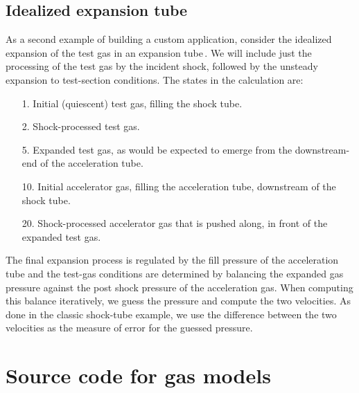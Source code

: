 \documentclass[landscape,12pt,a4paper]{article}
\begin{document}
\subsection{Idealized expansion tube}
%
As a second example of building a custom application, consider the idealized expansion
of the test gas in an expansion tube\,\cite{trimpi_62}.
We will include just the processing of the test gas by the incident shock,
followed by the unsteady expansion to test-section conditions. 
The states in the calculation are:
\begin{itemize}
 \item [1.] Initial (quiescent) test gas, filling the shock tube.
 \item [2.] Shock-processed test gas.
 \item [5.] Expanded test gas, as would be expected to emerge from the downstream-end of the acceleration tube.
 \item [10.] Initial accelerator gas, filling the acceleration tube, downstream of the shock tube.
 \item [20.] Shock-processed accelerator gas that is pushed along, in front of the expanded test gas.
\end{itemize}
The final expansion process is regulated by the fill pressure of the acceleration tube
and the test-gas conditions are determined by balancing the expanded gas pressure against
the post shock pressure of the acceleration gas.
When computing this balance iteratively, we guess the pressure and compute the two velocities.
As done in the classic shock-tube example, 
we use the difference between the two velocities as the measure of error for the guessed pressure.






\newpage




\newpage
\appendix
\section{Source code for gas models}
\label{gas-model-sec}
%
\end{document}
